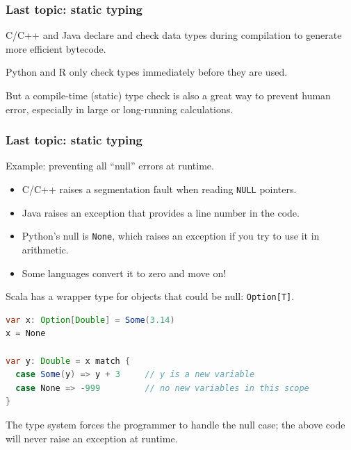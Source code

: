 \documentclass[compress]{beamer}
\begin{document}
\begin{frame}
\frametitle{Last topic: static typing}

C/C++ and Java declare and check data types during compilation to generate more efficient bytecode.

\vspace{0.2 cm}
Python and R only check types immediately before they are used.

\vspace{0.2 cm}
But a compile-time (static) type check is also a great way to prevent human error, especially in large or long-running calculations.
\end{frame}

\begin{frame}[fragile]
\frametitle{Last topic: static typing}

Example: preventing all ``null'' errors at runtime.
\begin{itemize}
\item C/C++ raises a segmentation fault when reading {\tt NULL} pointers.
\item Java raises an exception that provides a line number in the code.
\item Python's null is {\tt None}, which raises an exception if you try to use it in arithmetic.
\item Some languages convert it to zero and move on!
\end{itemize}

\vfill
Scala has a wrapper type for objects that could be null: {\tt Option[T]}.

\begin{lstlisting}[language=java]
var x: Option[Double] = Some(3.14)
x = None

var y: Double = x match {
  case Some(y) => y + 3     // y is a new variable
  case None => -999         // no new variables in this scope
}
\end{lstlisting}

The type system forces the programmer to handle the null case; the above code will never raise an exception at runtime.
\end{frame}
\end{document}
